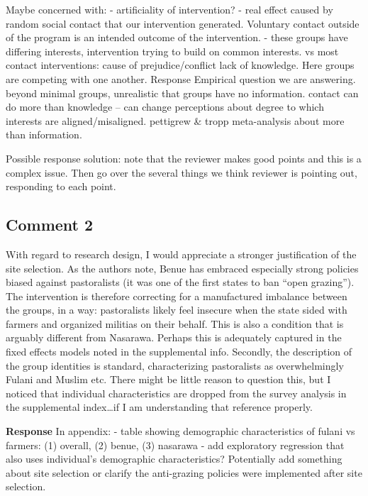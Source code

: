 \documentclass[
]{article}
\begin{document}
Maybe concerned with: - artificiality of intervention? - real effect
caused by random social contact that our intervention generated.
Voluntary contact outside of the program is an intended outcome of the
intervention. - these groups have differing interests, intervention
trying to build on common interests. vs most contact interventions:
cause of prejudice/conflict lack of knowledge. Here groups are competing
with one another. Response Empirical question we are answering. beyond
minimal groups, unrealistic that groups have no information. contact can
do more than knowledge -- can change perceptions about degree to which
interests are aligned/misaligned. pettigrew \& tropp meta-analysis about
more than information.

Possible response solution: note that the reviewer makes good points and
this is a complex issue. Then go over the several things we think
reviewer is pointing out, responding to each point.

\hypertarget{comment-2-1}{%
\subsection{Comment 2}\label{comment-2-1}}

With regard to research design, I would appreciate a stronger
justification of the site selection. As the authors note, Benue has
embraced especially strong policies biased against pastoralists (it was
one of the first states to ban ``open grazing''). The intervention is
therefore correcting for a manufactured imbalance between the groups, in
a way: pastoralists likely feel insecure when the state sided with
farmers and organized militias on their behalf. This is also a condition
that is arguably different from Nasarawa. Perhaps this is adequately
captured in the fixed effects models noted in the supplemental info.
Secondly, the description of the group identities is standard,
characterizing pastoralists as overwhelmingly Fulani and Muslim etc.
There might be little reason to question this, but I noticed that
individual characteristics are dropped from the survey analysis in the
supplemental index\ldots if I am understanding that reference properly.

\textbf{Response} In appendix: - table showing demographic
characteristics of fulani vs farmers: (1) overall, (2) benue, (3)
nasarawa - add exploratory regression that also uses individual's
demographic characteristics? Potentially add something about site
selection or clarify the anti-grazing policies were implemented after
site selection.
\end{document}
